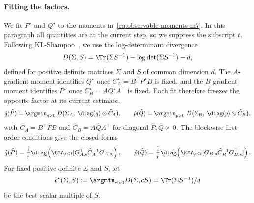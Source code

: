 \paragraph{Fitting the factors.} We fit $P^\star$ and $Q^\star$ to the
moments in~\eqref{eq:observable-moments-m7}. In this paragraph all
quantities are at the current step, so we suppress the subscript $t$.
Following KL-Shampoo~\cite{klshampoo}, we use the log-determinant
divergence~\cite{logdetdiv}
\[
  D(\Sigma,S)=\Tr(\Sigma S^{-1})-\log\det(\Sigma S^{-1})-d,
\]
defined for positive definite matrices $\Sigma$ and $S$ of common dimension
$d$. The $A$-gradient moment identifies $Q^\star$ once
$C^\star_A=B^\top P^\star B$ is fixed, and the $B$-gradient moment
identifies $P^\star$ once $C^\star_B=AQ^\star A^\top$ is fixed. Each fit
therefore freezes the opposite factor at its current estimate,
\begin{equation}\label{eq:factor-fit-m7}
  \hat{q}(\widehat P)
  =\argmin_{q>0}\;
  D\big(\Sigma_A,\; \diag(q) \otimes \widehat C_A\big),
  \qquad
  \hat{p}(\widehat Q)
  =\argmin_{p>0}\;
  D\big(\Sigma_B,\;\diag(p) \otimes \widehat C_B\big),
\end{equation}
with $\widehat C_A=B^\top\widehat PB$ and $\widehat C_B=A\widehat QA^\top$
for diagonal $\widehat P,\widehat Q\succ0$. The blockwise first-order
conditions give the closed forms
\[
  \hat{q}(\widehat P)=\frac1r\diag\!\left(\EMA_{s \leq t}[G_{A,s}^\top \widehat C_A^{-1}G_{A,s}]\right),
  \qquad
  \hat{p}(\widehat Q)=\frac1r\diag\!\left(\EMA_{s \leq t}[G_{B,s} \widehat C_B^{-1}G_{B,s}^\top]\right).
\]
For fixed positive definite $\Sigma$ and $S$, let
\[
  c^\star(\Sigma,S) :=\argmin_{c>0}D(\Sigma,cS)=\Tr(\Sigma S^{-1})/d
\]
be the best scalar multiple of $S$.

